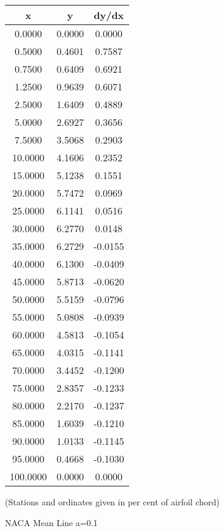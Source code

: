 \documentclass[11pt]{book}
\begin{document}
 \vspace{8mm}
 \begin{tabular}{|c|c|c|}  \hline
 x & y & dy/dx \\
 \hline
0.0000 & 0.0000 & 0.0000 \\
0.5000 & 0.4601 & 0.7587 \\
0.7500 & 0.6409 & 0.6921 \\
1.2500 & 0.9639 & 0.6071 \\
2.5000 & 1.6409 & 0.4889 \\
5.0000 & 2.6927 & 0.3656 \\
7.5000 & 3.5068 & 0.2903 \\
10.0000 & 4.1606 & 0.2352 \\
15.0000 & 5.1238 & 0.1551 \\
20.0000 & 5.7472 & 0.0969 \\
25.0000 & 6.1141 & 0.0516 \\
30.0000 & 6.2770 & 0.0148 \\
35.0000 & 6.2729 & -0.0155 \\
40.0000 & 6.1300 & -0.0409 \\
45.0000 & 5.8713 & -0.0620 \\
50.0000 & 5.5159 & -0.0796 \\
55.0000 & 5.0808 & -0.0939 \\
60.0000 & 4.5813 & -0.1054 \\
65.0000 & 4.0315 & -0.1141 \\
70.0000 & 3.4452 & -0.1200 \\
75.0000 & 2.8357 & -0.1233 \\
80.0000 & 2.2170 & -0.1237 \\
85.0000 & 1.6039 & -0.1210 \\
90.0000 & 1.0133 & -0.1145 \\
95.0000 & 0.4668 & -0.1030 \\
100.0000 & 0.0000 & 0.0000 \\
 \hline
 \end{tabular}
 \vspace{8mm}

(Stations and ordinates given in per cent of airfoil chord)

 \newpage
 \label{mla=0.1}
 \begin{Large}
 NACA Mean Line a=0.1
 \end{Large}
  
\end{document}

